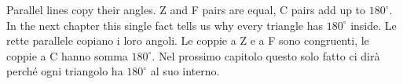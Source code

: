 \begin{keyidea}{}{}
Parallel lines copy their angles. Z and F pairs are equal, C pairs add up to $180^\circ$. In the next chapter this single fact tells us why every triangle has $180^\circ$ inside.
\tcblower
Le rette parallele copiano i loro angoli. Le coppie a Z e a F sono congruenti, le coppie a C hanno somma $180^\circ$. Nel prossimo capitolo questo solo fatto ci dirà perché ogni triangolo ha $180^\circ$ al suo interno.
\end{keyidea}

